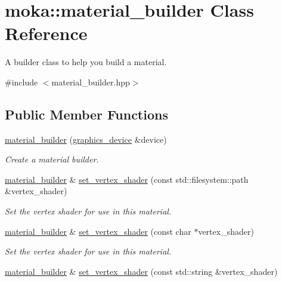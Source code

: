 \hypertarget{classmoka_1_1material__builder}{}\section{moka\+::material\+\_\+builder Class Reference}
\label{classmoka_1_1material__builder}


A builder class to help you build a material.  




{\ttfamily \#include $<$material\+\_\+builder.\+hpp$>$}

\subsection*{Public Member Functions}
\begin{DoxyCompactItemize}
\item 
\mbox{\hyperlink{classmoka_1_1material__builder_a5ff32c4d8f82b4cc91abb9fb4e2b2f38}{material\+\_\+builder}} (\mbox{\hyperlink{classmoka_1_1graphics__device}{graphics\+\_\+device}} \&device)
\begin{DoxyCompactList}\small\item\em Create a material builder. \end{DoxyCompactList}\item 
\mbox{\hyperlink{classmoka_1_1material__builder}{material\+\_\+builder}} \& \mbox{\hyperlink{classmoka_1_1material__builder_a0feeb28a696c2a2920f6d082886f2b27}{set\+\_\+vertex\+\_\+shader}} (const std\+::filesystem\+::path \&vertex\+\_\+shader)
\begin{DoxyCompactList}\small\item\em Set the vertex shader for use in this material. \end{DoxyCompactList}\item 
\mbox{\hyperlink{classmoka_1_1material__builder}{material\+\_\+builder}} \& \mbox{\hyperlink{classmoka_1_1material__builder_a837ee2848797bb997756598d478e3002}{set\+\_\+vertex\+\_\+shader}} (const char $\ast$vertex\+\_\+shader)
\begin{DoxyCompactList}\small\item\em Set the vertex shader for use in this material. \end{DoxyCompactList}\item 
\mbox{\hyperlink{classmoka_1_1material__builder}{material\+\_\+builder}} \& \mbox{\hyperlink{classmoka_1_1material__builder_a491153eb2c594163916f5eaeb1fffb70}{set\+\_\+vertex\+\_\+shader}} (const std\+::string \&vertex\+\_\+shader)

\end{DoxyCompactItemize}
